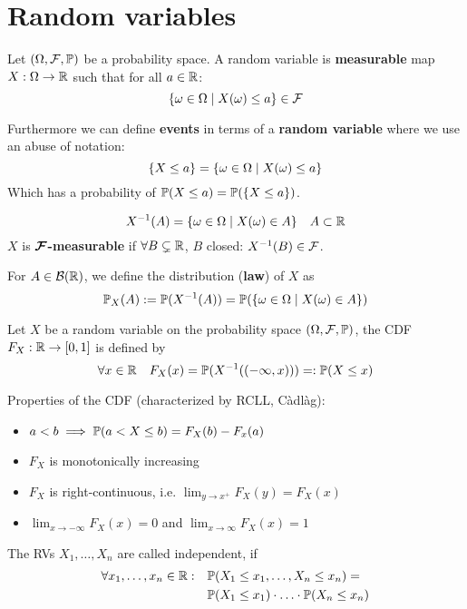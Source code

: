 \section{Random variables}

Let \((\O, \F, \P)\) be a probability space. A random variable is \textbf{measurable} map \(X: \Omega \to \R\)  such that for all \(a \in \R\):
\[\{\omega \in \O \mid X(\omega) \leq a\} \in \F\]

Furthermore we can define \textbf{events} in terms of a \textbf{random variable} where we use an abuse of notation:
\[\{X \leq a\} = \{\omega \in \O \mid X(\omega) \leq a\}\]
Which has a probability of \(\P(X \leq a) = \P(\{X \leq a\})\).

\begin{definition*}
  \[X^{-1}(A) = \{\omega \in \O \mid X(\omega) \in A\} \quad A \subset \R\]
  \(X\) is \textbf{\(\bm{\F}\)-measurable} if \(\forall B \subsetneq \R\), \(B\) closed: \(X^{-1}(B) \in \F\).
\end{definition*}

\begin{definition*}
  For \(A \in \B(\R)\), we define the distribution (\textbf{law}) of \(X\) as
  \[\P_X(A) := \P(X^{-1}(A)) = \P(\{\omega \in \O \mid X(\omega) \in A\})\]
\end{definition*}

\begin{definition*}
  Let \(X\) be a random variable on the probability space \((\O, \F, \P)\), the CDF \(F_X: \R \to [0, 1]\) is defined by
  \[\forall x \in \R \quad F_X(x) = \P(X^{-1}((-\infty, x))) =:\P(X \leq x) \]
\end{definition*}
Properties of the CDF (characterized by RCLL, Càdlàg):
\begin{itemize}
  \item \(a < b \implies \P(a < X \leq b) = F_X(b) - F_x(a)\)
  \item \(F_X\) is monotonically increasing
  \item \(F_X\) is right-continuous, i.e. \(\lim_{y \to x^+} F_X(y) = F_X(x)\)
  \item \(\lim_{x \to -\infty} F_X (x) = 0\) and \(\lim_{x \to \infty} F_X(x) = 1\)
\end{itemize}

\begin{definition*}
  The RVs \(X_1, \ldots, X_n\) are called independent, if
  \begin{align*}
    \forall x_1, \ldots, x_n \in \R: \quad & \P(X_1 \leq x_1, \ldots, X_n \leq x_n) = \\
    & \P(X_1 \leq x_1) \cdot \ldots \cdot \P(X_n \leq x_n)
  \end{align*}
\end{definition*}

